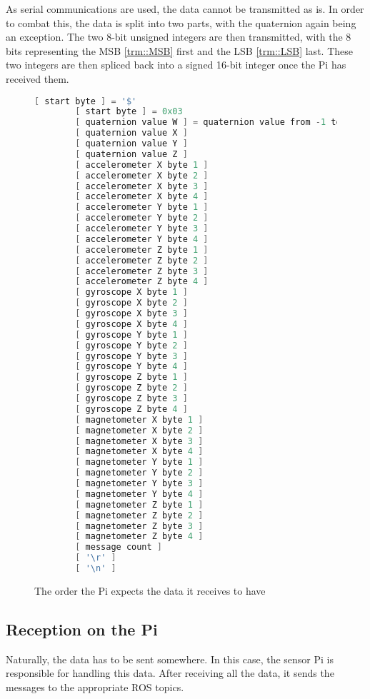 As serial communications are used, the data cannot be transmitted as is.
In order to combat this, the data is split into two parts, with the quaternion again being an exception.
The two 8-bit unsigned integers are then transmitted, with the 8 bits representing the MSB \ref{trm::MSB} first and the LSB \ref{trm::LSB} last.
These two integers are then spliced back into a signed 16-bit integer once the Pi has received them.


\begin{figure}[H]
    \begin{lstlisting}[language=c++,firstnumber=0]
        [ start byte ] = '$'
        [ start byte ] = 0x03
        [ quaternion value W ] = quaternion value from -1 to +1, multiplied by 100
        [ quaternion value X ]
        [ quaternion value Y ]
        [ quaternion value Z ]
        [ accelerometer X byte 1 ]
        [ accelerometer X byte 2 ]
        [ accelerometer X byte 3 ]
        [ accelerometer X byte 4 ]
        [ accelerometer Y byte 1 ]
        [ accelerometer Y byte 2 ]
        [ accelerometer Y byte 3 ]
        [ accelerometer Y byte 4 ]
        [ accelerometer Z byte 1 ]
        [ accelerometer Z byte 2 ]
        [ accelerometer Z byte 3 ]
        [ accelerometer Z byte 4 ]
        [ gyroscope X byte 1 ] 
        [ gyroscope X byte 2 ]
        [ gyroscope X byte 3 ]
        [ gyroscope X byte 4 ]       
        [ gyroscope Y byte 1 ] 
        [ gyroscope Y byte 2 ]
        [ gyroscope Y byte 3 ]
        [ gyroscope Y byte 4 ] 
        [ gyroscope Z byte 1 ] 
        [ gyroscope Z byte 2 ]
        [ gyroscope Z byte 3 ]
        [ gyroscope Z byte 4 ] 
        [ magnetometer X byte 1 ]
        [ magnetometer X byte 2 ]
        [ magnetometer X byte 3 ]
        [ magnetometer X byte 4 ]
        [ magnetometer Y byte 1 ]
        [ magnetometer Y byte 2 ]
        [ magnetometer Y byte 3 ]
        [ magnetometer Y byte 4 ]
        [ magnetometer Z byte 1 ]
        [ magnetometer Z byte 2 ]
        [ magnetometer Z byte 3 ]
        [ magnetometer Z byte 4 ]
        [ message count ]
        [ '\r' ] 
        [ '\n' ] 
    \end{lstlisting} 
\caption{The order the Pi expects the data it receives to have}
\label{fig::dataformat}
\end{figure}

\subsection{Reception on the Pi}
Naturally, the data has to be sent somewhere.
In this case, the sensor Pi is responsible for handling this data.
After receiving all the data, it sends the messages to the appropriate ROS topics.

